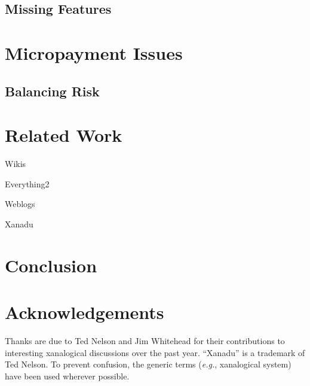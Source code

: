 \documentclass{acm_proc_article-sp}
\begin{document}
\subsection{Missing Features}



\section{Micropayment Issues}


\subsection{Balancing Risk}



\section{Related Work}
\label{sec:RelatedWork}

Wikis
\cite{WikiWikiWeb}
\cite{Wikipedia}

Everything2
\cite{Everything2}

Weblogs
\cite{kuro5hin}

Xanadu

\section{Conclusion}


\section{Acknowledgements}
Thanks are due to Ted Nelson and Jim Whitehead for their contributions to interesting xanalogical discussions over the past year. ``Xanadu'' is a trademark of Ted Nelson.  To prevent confusion, the generic terms ({\it e.g.}, xanalogical system) have been used wherever possible.



\end{document}
